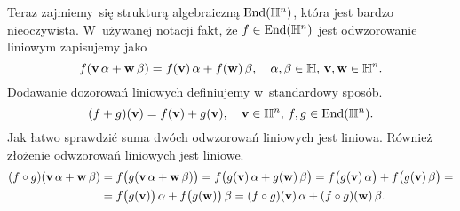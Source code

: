 \documentclass[a4paper,11pt]{article}
\begin{document}
Teraz zajmiemy~się strukturą algebraiczną $\mathrm{End}( \mathbb{H}^{ n } )$, która jest
bardzo nieoczywista. W~używanej notacji fakt, że $f \in \mathrm{End}( \mathbb{H}^{ n } )$
jest odwzorowanie liniowym zapisujemy jako
\begin{equation}
  \label{eq:Wojtynski-69}
  f( \mathbf{v} \, \alpha + \mathbf{w} \, \beta ) =
  f( \mathbf{v} ) \, \alpha + f( \mathbf{w} ) \, \beta, \quad
  \alpha, \beta \in \mathbb{H}, \, \mathbf{v}, \mathbf{w} \in \mathbb{H}^{ n }.
\end{equation}
Dodawanie dozorowań liniowych definiujemy w~standardowy sposób.
\begin{equation}
  \label{eq:Wojtynski-70}
  ( f + g )( \mathbf{v} ) = f( \mathbf{v} ) + g( \mathbf{v} ), \quad
  \mathbf{v} \in \mathbb{H}^{ n }, \, f, g \in \mathrm{End}( \mathbb{H}^{ n } ).
\end{equation}
Jak łatwo sprawdzić suma dwóch odwzorowań liniowych jest liniowa.
Również złożenie odwzorowań liniowych jest liniowe.
\begin{equation}
  \label{eq:Wojtynski-71}
  \begin{split}
    ( f \circ g )( \mathbf{v} \, \alpha + \mathbf{w} \, \beta )
    &=
      f\big( g( \mathbf{v} \, \alpha + \mathbf{w} \, \beta ) \big) =
      f\big( g( \mathbf{v} ) \, \alpha + g( \mathbf{w} ) \, \beta \big) =
      f\big( g( \mathbf{v} ) \, \alpha \big)
      + f\big( g( \mathbf{v} ) \, \beta \big) = \\
    &=
      f\big( g( \mathbf{v} ) \big) \, \alpha
      + f\big( g( \mathbf{w} ) \big) \, \beta =
      ( f \circ g )( \mathbf{v} ) \, \alpha + ( f \circ g )( \mathbf{w} ) \, \beta.
  \end{split}
\end{equation}
\end{document}
